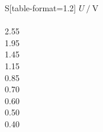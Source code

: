 


\begin{table}
    \centering
    \caption{Messdaten zur Zeitabhängigkeit der Amplitude}
    \label {tab:Mess1}
    \begin{tabular}{S[table-format=1.2]}
        \toprule
        $U \mathbin{/} \unit{\volt}$ \\
         \\
        2.55 \\
        1.95 \\
        1.45 \\
        1.15 \\
        0.85 \\
        0.70 \\
        0.60 \\
        0.50 \\
        0.40 \\
    \bottomrule 
    \end{tabular}
\end{table}

